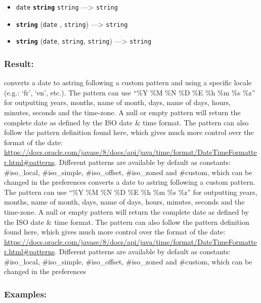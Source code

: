 \documentclass[]{book}
\providecommand{\tightlist}{%
  \setlength{\itemsep}{0pt}\setlength{\parskip}{0pt}}
\theoremstyle{definition}
\theoremstyle{definition}
\theoremstyle{definition}
\theoremstyle{remark}
\begin{document}
\begin{itemize}
\tightlist
\item
  \texttt{date} \textbf{\texttt{string}} \texttt{string}
  ---\textgreater{} \texttt{string}
\item
  \textbf{\texttt{string}} (\texttt{date} , \texttt{string})
  ---\textgreater{} \texttt{string}
\item
  \textbf{\texttt{string}} (\texttt{date}, \texttt{string},
  \texttt{string}) ---\textgreater{} \texttt{string}
\end{itemize}

\subsubsection{Result:}\label{result-488}

converts a date to astring following a custom pattern and using a
specific locale (e.g.: `fr', `en', etc.). The pattern can use ``\%Y \%M
\%N \%D \%E \%h \%m \%s \%z'' for outputting years, months, name of
month, days, name of days, hours, minutes, seconds and the time-zone. A
null or empty pattern will return the complete date as defined by the
ISO date \& time format. The pattern can also follow the pattern
definition found here, which gives much more control over the format of
the date:
\url{https://docs.oracle.com/javase/8/docs/api/java/time/format/DateTimeFormatter.html\#patterns}.
Different patterns are available by default as constants: \#iso\_local,
\#iso\_simple, \#iso\_offset, \#iso\_zoned and \#custom, which can be
changed in the preferences converts a date to astring following a custom
pattern. The pattern can use ``\%Y \%M \%N \%D \%E \%h \%m \%s \%z'' for
outputting years, months, name of month, days, name of days, hours,
minutes, seconds and the time-zone. A null or empty pattern will return
the complete date as defined by the ISO date \& time format. The pattern
can also follow the pattern definition found here, which gives much more
control over the format of the date:
\url{https://docs.oracle.com/javase/8/docs/api/java/time/format/DateTimeFormatter.html\#patterns}.
Different patterns are available by default as constants: \#iso\_local,
\#iso\_simple, \#iso\_offset, \#iso\_zoned and \#custom, which can be
changed in the preferences

\subsubsection{Examples:}\label{examples-351}
\end{document}

